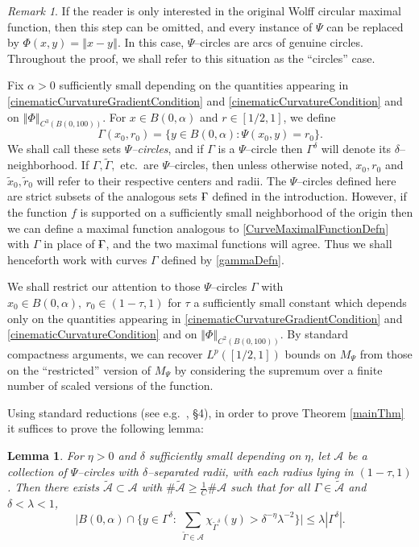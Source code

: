 \documentclass[reqno]{amsart}
\newtheorem{lem}[thm]{Lemma}
\theoremstyle{definition}
\theoremstyle{remark}
\newtheorem{rem}[thm]{Remark}
\theoremstyle{remark}
\newcommand{\norm}[1]{\left\Vert#1\right\Vert}
\newcommand{\Gammabar}{\textrm{\sout{$\phantom{.}$}$\!\!\Gamma$}}
\begin{document}
\begin{rem}
 If the reader is only interested in the original Wolff circular maximal function, then this step can be omitted, and every instance of $\Psi$ can be replaced by $\Phi(x,y) = \norm{x-y}$. In this case, $\Psi$--circles are arcs of genuine circles. Throughout the proof, we shall refer to this situation as the ``circles'' case.
\end{rem}

Fix $\alpha>0$ sufficiently small depending on the quantities appearing in \eqref{cinematicCurvatureGradientCondition} and \eqref{cinematicCurvatureCondition} and on $\norm{\Phi}_{C^3(B(0,100))}$. For $x\in B(0,\alpha)$ and $r\in [1/2,1]$, we define
\begin{equation}\label{gammaDefn}
\Gamma(x_0,r_0)=\{y\in B(0,\alpha)\colon\Psi(x_0,y)=r_0\}.
\end{equation}
We shall call these sets \emph{$\Psi$--circles}, and if $\Gamma$ is a $\Psi$--circle then $\Gamma^\delta$ will denote its $\delta$--neighborhood. If $\Gamma,\tilde\Gamma,$ etc.~are $\Psi$--circles, then unless otherwise noted, $x_0,r_0$ and $\tilde x_0,\tilde r_0$ will refer to their respective centers and radii. The $\Psi$--circles defined here are strict subsets of the analogous sets $\Gammabar$ defined in the introduction. However, if the function $f$ is supported on a sufficiently small neighborhood of the origin then we can define a maximal function analogous to \eqref{CurveMaximalFunctionDefn} with $\Gamma$ in place of $\Gammabar$, and the two maximal functions will agree. Thus we shall henceforth work with curves $\Gamma$ defined by \eqref{gammaDefn}.

We shall restrict our attention to those $\Psi$--circles $\Gamma$ with $x_0\in B(0,\alpha),\ r_0\in(1-\tau,1)$ for $\tau$ a sufficiently small constant which depends only on the quantities appearing in \eqref{cinematicCurvatureGradientCondition} and \eqref{cinematicCurvatureCondition} and on $\norm{\Phi}_{C^2(B(0,100))}$. By standard compactness arguments, we can recover $L^p([1/2,1])$ bounds on $M_\Psi$ from those on the ``restricted'' version of $M_\Psi$ by considering the supremum over a finite number of scaled versions of the function.

Using standard reductions (see e.g.~\cite{Schlag}, \S4), in order to prove Theorem \ref{mainThm} it suffices to prove the following lemma:
\begin{lem}\label{quantitativeMaximalFunctionBound}
For $\eta>0$ and $\delta$ sufficiently small depending on $\eta$, let $\mathcal A$ be a collection of $\Psi$--circles with $\delta$--separated radii, with each radius lying in $(1-\tau,1)$. Then there exists $\tilde{\mathcal A}\subset\mathcal A$ with $\#\tilde{\mathcal A}\geq\frac{1}{C}\# \mathcal A$ such that for all $\Gamma\in\tilde{\mathcal A}$ and $\delta<\lambda<1$,
\begin{equation}
\Big|B(0,\alpha)\cap\{y\in \Gamma^\delta\colon\ \sum_{\tilde\Gamma\in\mathcal A}\chi_{\tilde\Gamma^\delta}(y) >\delta^{-\eta}\lambda^{-2}\}\Big|\leq \lambda|\Gamma^\delta|.
\end{equation}
\end{lem}
\end{document}
